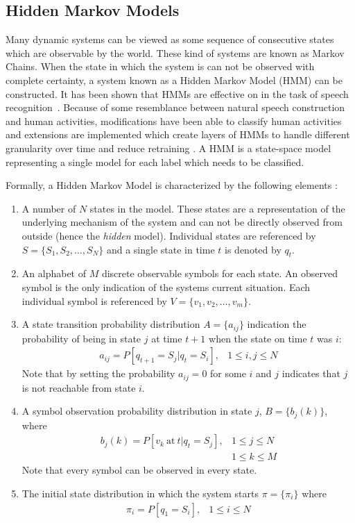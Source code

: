 \subsection{Hidden Markov Models}
Many dynamic systems can be viewed as some sequence of consecutive states which are observable by the world.
These kind of systems are known as Markov Chains.
When the state in which the system is can not be observed with complete certainty, a system known as a Hidden Markov Model (HMM) can be constructed.
It has been shown that HMMs are effective on in the task of speech recognition~\cite{rabiner1989tutorial}.
Because of some resemblance between natural speech construction and human activities, modifications have been able to classify human activities~\cite{guenterberg2009distributed} and extensions are implemented which create layers of HMMs to handle different granularity over time and reduce retraining \cite{oliver2002layered,perdikis2008recognition}.
A HMM is a state-space model representing a single model for each label which needs to be classified.

Formally, a Hidden Markov Model is characterized by the following elements
\cite{rabiner1989tutorial}:
\begin{enumerate}
	\item
		A number of $N$ states in the model.
		These states are a representation of the underlying mechanism of the system and can not be directly observed from outside (hence the \emph{hidden} model).
		Individual states are referenced by $S = \{S_1, S_2, \dots, S_N \}$ and a single state in time $t$ is denoted by $q_t$.
	\item
		An alphabet of $M$ discrete observable symbols for each state.
		An observed symbol is the only indication of the systems current situation.
		Each individual symbol is referenced by $V = \{ v_1, v_2, \dots, v_m \}$.
	\item
		A state transition probability distribution $A = \{ a_{ij} \}$ indication the probability of being in state $j$ at time $t+1$ when the state on time $t$ was $i$:
		\begin{eqnarray}
			a_{ij} = P [ q_{t+1} = S_j | q_t = S_i ], & 1 \le i, j \le N
		\end{eqnarray}
		Note that by setting the probability $a_{ij}=0$ for some $i$ and $j$ indicates that $j$ is not reachable from state $i$.
	\item
		A symbol observation probability distribution in state $j$, $B = \{b_j(k) \}$, where
		\begin{eqnarray}
			b_j(k) = P[ v_k\ \mathrm{at} \ t | q_t = S_j], & 1 \le j \le N \nonumber \\
			& 1 \le k \le M
		\end{eqnarray}
		Note that every symbol can be observed in every state.
	\item
	The initial state distribution in which the system starts $\pi= \{ \pi_i \}$ where
	\begin{eqnarray}
		\pi_i = P[q_1 = S_i], & 1 \le i \le N
	\end{eqnarray}
\end{enumerate}

